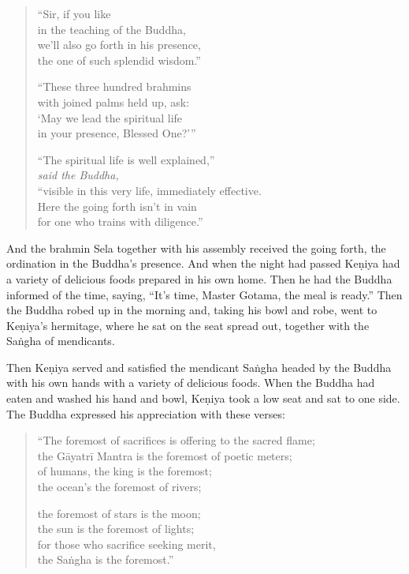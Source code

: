 \documentclass[12pt,openany]{book}%
\newcommand*{\scspeaker}[1]{\hspace{2em}\textit{#1}}
\begin{document}
\begin{verse}
“Sir, if you like \\
in the teaching of the Buddha, \\
we’ll also go forth in his presence, \\
the one of such splendid wisdom.” 

“These three hundred brahmins \\
with joined palms held up, ask: \\
‘May we lead the spiritual life \\
in your presence, Blessed One?’” 

“The spiritual life is well explained,” \\
\scspeaker{said the Buddha, }\\
“visible in this very life, immediately effective. \\
Here the going forth isn’t in vain \\
for one who trains with diligence.” 

%
\end{verse}

And the brahmin Sela together with his assembly received the going forth, the ordination in the Buddha’s presence. And when the night had passed \textsanskrit{Keṇiya} had a variety of delicious foods prepared in his own home. Then he had the Buddha informed of the time, saying, “It’s time, Master Gotama, the meal is ready.” Then the Buddha robed up in the morning and, taking his bowl and robe, went to \textsanskrit{Keṇiya}’s hermitage, where he sat on the seat spread out, together with the \textsanskrit{Saṅgha} of mendicants. 

Then \textsanskrit{Keṇiya} served and satisfied the mendicant \textsanskrit{Saṅgha} headed by the Buddha with his own hands with a variety of delicious foods. When the Buddha had eaten and washed his hand and bowl, \textsanskrit{Keṇiya} took a low seat and sat to one side. The Buddha expressed his appreciation with these verses: 

\begin{verse}%
“The foremost of sacrifices is offering to the sacred flame; \\
the \textsanskrit{Gāyatrī} Mantra is the foremost of poetic meters; \\
of humans, the king is the foremost; \\
the ocean’s the foremost of rivers; 

the foremost of stars is the moon; \\
the sun is the foremost of lights; \\
for those who sacrifice seeking merit, \\
the \textsanskrit{Saṅgha} is the foremost.” 

%
\end{verse}
\end{document}
